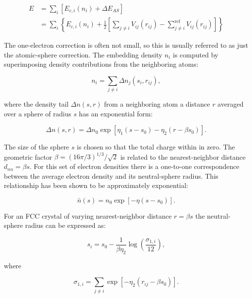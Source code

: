 \begin{equation}
    \begin{split}
    E   &=\sum_i \left[ E_{c,i}(n_i) + \Delta E_{AS} \right] \\
        &= \sum_i \left\{E_{c,i}(n_i) + \frac{1}{2} \left[
        \sum_{j \neq i} V_{ij}(r_{ij}) - \sum_{j \neq i}^{\text{ref}}
        V_{ij}(r_{ij}) \right] \right\}
    \end{split}
\end{equation}

The one-electron correction is often not small, so this is usually
referred to as just the atomic-sphere correction.
The embedding density $n_i$ is computed by superimposing
density contributions from the neighboring atoms:

\begin{equation}
    n_i = \sum_{j \neq i} \Delta n_j(s_i, r_{ij}) ,
\end{equation}

where the density tail $\Delta n (s, r)$ from a neighboring
atom a distance $r$ averaged over a sphere of radius $s$
has an exponential form:

\begin{equation}
    \Delta n(s,r) = \Delta n_0 \exp \left[ \eta_1 (s - s_0)
    - \eta_2 (r - \beta s_0) \right] .
\end{equation}

The size of the sphere $s$ is chosen so that the total charge
within in zero. 
The geometric factor $\beta = \left(16\pi / 3\right)^{1/3} / \sqrt{2}$
is related to the nearest-neighbor distance $d_{nn} = \beta s$.
For this set of electron densities
there is a one-to-one correspondence between the average electron
density and its neutral-sphere radius.
This relationship has been shown to be approximately exponential:

\begin{equation}
    \bar{n}(s) = n_0 \exp \left[ - \eta(s - s_0) \right] .
\end{equation}

For an FCC crystal of varying nearest-neighbor distance
$r = \beta s$ the neutral-sphere radius can be expressed as:

\begin{equation}
    s_i = s_0 - \frac{1}{\beta \eta_2} \log \left(
    \frac{\sigma_{1,i}}{12} \right) ,
\end{equation}

where

\begin{equation}
    \sigma_{1, i} = \sum_{j \neq i} \exp \left[ - \eta_2
    \left( r_{ij} - \beta s_0 \right) \right] .
\end{equation}

